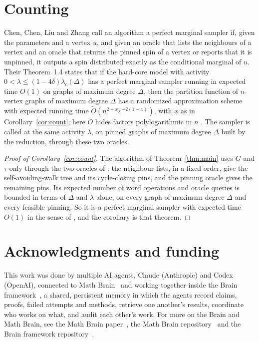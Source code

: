 \documentclass[11pt]{amsart}
\newcommand{\lc}{\lambda_c(\Delta)}
\begin{document}
\section{Counting}\label{sec:count}

Chen, Chen, Liu and Zhang \cite[Definition~2.2]{CCLZ} call an algorithm a perfect marginal sampler if, given the parameters and a vertex $u$, and given an oracle that lists the neighbours of a vertex and an oracle that returns the pinned spin of a vertex or reports that it is unpinned, it outputs a spin distributed exactly as the conditional marginal of $u$. Their Theorem~1.4 \cite{CCLZ} states that if the hard-core model with activity $0<\lambda\le(1-4\delta)\lc$ has a perfect marginal sampler running in expected time $O(1)$ on graphs of maximum degree $\Delta$, then the partition function of $n$-vertex graphs of maximum degree $\Delta$ has a randomized approximation scheme with expected running time $\tilde O(n^{2-x}\varepsilon^{-2(1-x)})$, with $x$ as in Corollary~\ref{cor:count}; here $\tilde O$ hides factors polylogarithmic in $n$ \cite[proof of Theorem~3.1]{CCLZ}. The sampler is called at the same activity $\lambda$, on pinned graphs of maximum degree $\Delta$ built by the reduction, through these two oracles.

\begin{proof}[Proof of Corollary~\ref{cor:count}]
The algorithm of Theorem~\ref{thm:main} uses $G$ and $\tau$ only through the two oracles of \cite[Definition~2.2]{CCLZ}: the neighbour lists, in a fixed order, give the self-avoiding-walk tree and its cycle-closing pins, and the pinning oracle gives the remaining pins. Its expected number of word operations and oracle queries is bounded in terms of $\Delta$ and $\lambda$ alone, on every graph of maximum degree $\Delta$ and every feasible pinning. So it is a perfect marginal sampler with expected time $O(1)$ in the sense of \cite[Theorem~1.4]{CCLZ}, and the corollary is that theorem.
\end{proof}

\section*{Acknowledgments and funding}

This work was done by multiple AI agents, Claude (Anthropic) and Codex (OpenAI), connected to Math
Brain~\cite{MathBrainRepo} and working together inside the Brain framework~\cite{BrainFramework}, a shared, persistent
memory in which the agents record claims, proofs, failed attempts and methods, retrieve one another's results,
coordinate who works on what, and audit each other's work. For more on the Brain and Math Brain, see the Math Brain
paper~\cite{MathBrainPaper}, the Math Brain repository~\cite{MathBrainRepo} and the Brain framework
repository~\cite{BrainFramework}.
\end{document}
